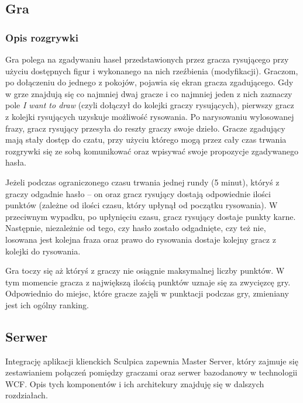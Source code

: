 \subsection{Gra}
\subsubsection{Opis rozgrywki}
Gra polega na zgadywaniu haseł przedstawionych przez gracza rysującego przy użyciu dostępnych figur i wykonanego na nich rzeźbienia (modyfikacji). Graczom, po dołączeniu do jednego z pokojów, pojawia się ekran gracza zgadującego. Gdy w grze znajdują się co najmniej dwaj gracze i co najmniej jeden z nich zaznaczy pole \textit{I want to draw} (czyli dołączył do kolejki graczy rysujących), pierwszy gracz z kolejki rysujących uzyskuje możliwość rysowania. Po narysowaniu wylosowanej frazy, gracz rysujący przesyła do reszty graczy swoje dzieło. Gracze zgadujący mają stały dostęp do czatu, przy użyciu którego mogą przez cały czas trwania rozgrywki się ze sobą komunikować oraz wpisywać swoje propozycje zgadywanego hasła.

Jeżeli podczas ograniczonego czasu trwania jednej rundy (5 minut), któryś z graczy odgadnie hasło – on oraz gracz rysujący dostają odpowiednie ilości punktów (zależne od ilości czasu, który upłynął od początku rysowania). W przeciwnym wypadku, po upłynięciu czasu, gracz rysujący dostaje punkty karne. Następnie, niezależnie od tego, czy hasło zostało odgadnięte, czy też nie, losowana jest kolejna fraza oraz prawo do rysowania dostaje kolejny gracz z kolejki do rysowania.

Gra toczy się aż któryś z graczy nie osiągnie maksymalnej liczby punktów. W tym momencie gracza z największą ilością punktów uznaje się za zwycięzcę gry. Odpowiednio do miejsc, które gracze zajęli w punktacji podczas gry, zmieniany jest ich ogólny ranking.

\subsection{Serwer}
Integrację aplikacji klienckich Sculpica zapewnia Master Server, który zajmuje się zestawianiem połączeń pomiędzy graczami oraz serwer bazodanowy w technologii WCF. Opis tych komponentów i ich architekury znajduję się w dalszych rozdziałach.

